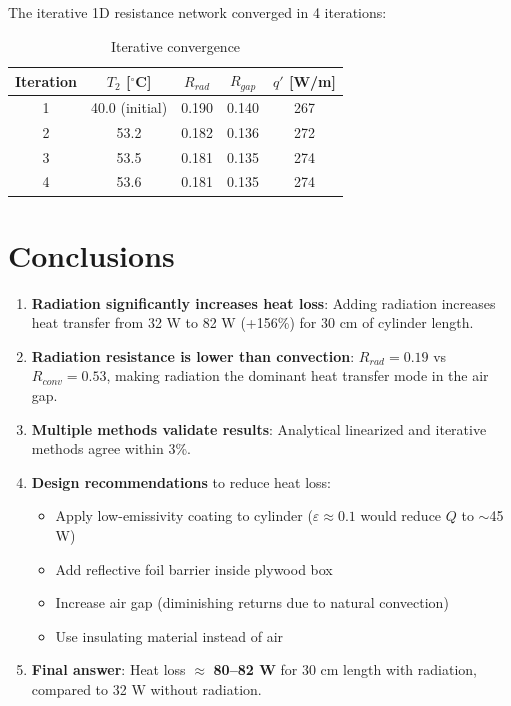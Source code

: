 \documentclass[11pt]{article}
\newcommand{\degC}{$^\circ$C}
\begin{document}
The iterative 1D resistance network converged in 4 iterations:

\begin{table}[H]
\centering
\caption{Iterative convergence}
\begin{tabular}{ccccc}
\toprule
\textbf{Iteration} & \textbf{$T_2$ [\degC]} & \textbf{$R_{rad}$} & \textbf{$R_{gap}$} & \textbf{$q'$ [W/m]} \\
\midrule
1 & 40.0 (initial) & 0.190 & 0.140 & 267 \\
2 & 53.2 & 0.182 & 0.136 & 272 \\
3 & 53.5 & 0.181 & 0.135 & 274 \\
4 & 53.6 & 0.181 & 0.135 & 274 \\
\bottomrule
\end{tabular}
\end{table}

\section{Conclusions}

\begin{enumerate}
    \item \textbf{Radiation significantly increases heat loss}: Adding radiation increases heat transfer from 32 W to 82 W (+156\%) for 30 cm of cylinder length.

    \item \textbf{Radiation resistance is lower than convection}: $R_{rad} = 0.19$ vs $R_{conv} = 0.53$, making radiation the dominant heat transfer mode in the air gap.

    \item \textbf{Multiple methods validate results}: Analytical linearized and iterative methods agree within 3\%.

    \item \textbf{Design recommendations} to reduce heat loss:
    \begin{itemize}
        \item Apply low-emissivity coating to cylinder ($\varepsilon \approx 0.1$ would reduce $Q$ to $\sim$45 W)
        \item Add reflective foil barrier inside plywood box
        \item Increase air gap (diminishing returns due to natural convection)
        \item Use insulating material instead of air
    \end{itemize}

    \item \textbf{Final answer}: Heat loss $\approx$ \textbf{80--82 W} for 30 cm length with radiation, compared to 32 W without radiation.
\end{enumerate}
\end{document}

